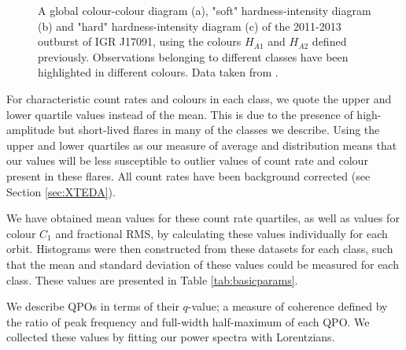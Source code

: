 \begin{figure}
\captionsetup{singlelinecheck=off}
\caption{A global colour-colour diagram (a), "soft" hardness-intensity diagram (b) and "hard" hardness-intensity diagram (c) of the 2011-2013 outburst of IGR J17091, using the colours $H_{A1}$ and $H_{A2}$ defined previously.  Observations belonging to different classes have been highlighted in different colours.  Data taken from \citealt{Altamirano_IGR_FH}.}
\label{fig:IIIisHarder}
\end{figure}

\par For characteristic count rates and colours in each class, we quote the upper and lower quartile values \citep{Kenney_Quartile} instead of the mean.  This is due to the presence of high-amplitude but short-lived flares in many of the classes we describe.  Using the upper and lower quartiles as our measure of average and distribution means that our values will be less susceptible to outlier values of count rate and colour present in these flares.  All count rates have been background corrected (see Section \ref{sec:XTEDA}).
\par We have obtained mean values for these count rate quartiles, as well as values for colour $C_1$ and fractional RMS, by calculating these values individually for each orbit.  Histograms were then constructed from these datasets for each class, such that the mean and standard deviation of these values could be measured for each class.  These values are presented in Table \ref{tab:basicparams}.
\par We describe QPOs in terms of their $q$-value; a measure of coherence defined by the ratio of peak frequency and full-width half-maximum of each QPO.  We collected these values by fitting our power spectra with Lorentzians.

